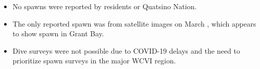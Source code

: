\begin{itemize}

\item No spawns were reported by residents or Quatsino Nation.

\item The only reported spawn was from satellite images on March ,
which appears to show spawn in Grant Bay.

\item Dive surveys were not possible due to COVID-19 delays and
the need to prioritize spawn surveys in the major WCVI region.

\end{itemize}